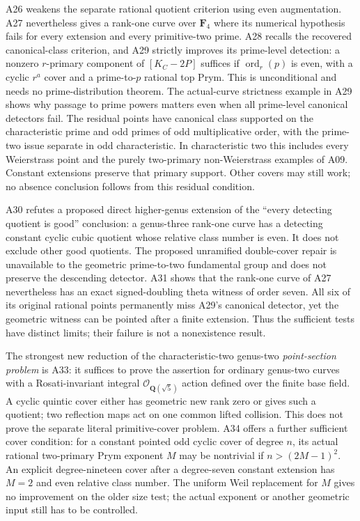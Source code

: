 A26 weakens the separate rational quotient criterion using even
augmentation. A27 nevertheless gives a rank-one curve over $\mathbf F_4$
where its numerical hypothesis fails for every extension and every
primitive-two prime. A28 recalls the recovered canonical-class criterion,
and A29 strictly improves its prime-level detection: a nonzero
$r$-primary component of $[K_C-2P]$ suffices if
$\operatorname{ord}_r(p)$ is even, with a cyclic $r^a$ cover and a
prime-to-$p$ rational top Prym. This is unconditional and needs no
prime-distribution theorem. The actual-curve strictness example in A29
shows why passage to prime powers matters even when all prime-level
canonical detectors fail. The residual points have canonical class
supported on the characteristic prime and odd primes of odd
multiplicative order, with the prime-two issue separate in odd
characteristic. In characteristic two this includes every Weierstrass
point and the purely two-primary non-Weierstrass examples of A09.
Constant extensions preserve that primary support. Other covers may
still work; no absence conclusion follows from this residual condition.

A30 refutes a proposed direct higher-genus extension of the
``every detecting quotient is good'' conclusion: a genus-three
rank-one curve has a detecting constant cyclic cubic quotient whose
relative class number is even. It does not exclude other good
quotients. The proposed unramified double-cover repair is unavailable
to the geometric prime-to-two fundamental group and does not preserve
the descending detector. A31 shows that the rank-one curve of A27
nevertheless has an exact signed-doubling theta witness of order seven.
All six of its original rational points permanently miss A29's
canonical detector, yet the geometric witness can be pointed after
a finite extension. Thus the sufficient tests have distinct limits;
their failure is not a nonexistence result.

The strongest new reduction of the characteristic-two genus-two
\emph{point-section problem} is A33: it suffices to prove the assertion
for ordinary genus-two curves with a Rosati-invariant integral
$\mathcal O_{\mathbf Q(\sqrt5)}$ action defined over the finite base field.
A cyclic quintic cover either has geometric new rank zero or gives such a
quotient; two reflection maps act on one common lifted collision.
This does not prove the separate literal primitive-cover problem.
A34 offers a further sufficient cover condition: for a constant pointed
odd cyclic cover of degree $n$, its actual rational two-primary Prym
exponent $M$ may be nontrivial if $n>(2M-1)^2$. An explicit degree-nineteen
cover after a degree-seven constant extension has $M=2$ and even relative
class number. The uniform Weil replacement for $M$ gives no improvement
on the older size test; the actual exponent or another geometric input
still has to be controlled.

